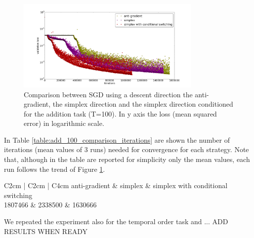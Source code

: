 \begin{figure}
	\centering
	\includegraphics[width= 0.8\textwidth]{chapter4/compare_add_simplex.png}
	\caption{Comparison between SGD using a descent direction the anti-gradient, the simplex direction and the simplex direction conditioned for the addition task (T=100). In y axis the loss (mean squared error) in logarithmic scale.}
	\label{fig:comparisong_add_simplex}
\end{figure}

In Table \ref{table:add_100_comparison_iterations} are shown the number of iterations (mean values of 3 runs) needed for convergence for each strategy. Note that, although in the table are reported for simplicity only the mean values, each run follows the trend of Figure \ref{fig:comparisong_add_simplex}.
\begin{table}
	\centering
	\begin{tabular}{C{2cm} | C{2cm} | C{4cm}}
		anti-gradient & simplex & simplex with conditional switching \\
		1807466 & 2338500 & 1630666 \\
	\end{tabular}
	\caption{Number of iterations until convergence for the addition task (T=100). Mean of 3 runs. TODO UPDATE RESULTS WITH NEW RUNS}
	\label{table:add_100_comparison_iterations}
\end{table}

We repeated the experiment also for the temporal order task and ... ADD RESULTS WHEN READY